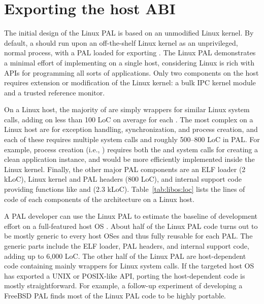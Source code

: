 \section{Exporting the host ABI}
\label{sec:linux:impl}

The initial design of the Linux PAL is based on an unmodified Linux kernel.
By default, a \graphene{} \picoproc{} should run upon
an off-the-shelf Linux kernel as an unprivileged, normal process, with a PAL loaded for exporting \thehostabi{}.
The Linux PAL demonstrates a minimal effort of implementing \thehostabi{}
on a single host, considering Linux is rich with APIs for programming all sorts of applications.
Only two \graphene{} components on the host requires extension or modification of the Linux kernel: a bulk IPC kernel module and a trusted reference monitor.



On a Linux host,
the majority of \hostapis{} are simply wrappers
for similar Linux system calls,
adding on less than 100 LoC on average for each \hostapi{}.
The most complex \hostapis{} on a Linux host are for exception handling, synchronization, and process creation, and each of these \hostapis{} requires multiple system calls and roughly 500--800 LoC in PAL.
For example, process creation (i.e., ) requires 
both the  and  system calls
for creating a clean
application instance, and would be more efficiently
implemented inside the Linux kernel.
Finally, the other major PAL components are an ELF loader (2 kLoC),
Linux kernel and PAL headers (800 LoC),
and internal support code providing functions like  and  (2.3 kLoC).
Table~\ref{tab:libos:loc} lists the lines of code of each components of the \graphene{} architecture on a Linux host.


A PAL developer can use the Linux PAL to estimate the baseline of \thehostabi{} development effort on a full-featured host OS .
About half of the Linux PAL code turns out to be
mostly generic to every host OSes
and thus fully reusable for each PAL.
The generic parts include
the ELF loader, PAL headers, and internal support code, adding up to \roughly{}6,000 LoC.
The other half of the Linux PAL are host-dependent code containing mainly wrappers for Linux system calls.
If the targeted host OS has exported a UNIX or POSIX-like API,
porting the host-dependent code is mostly straightforward.
For example, a follow-up experiment of developing a FreeBSD PAL finds most of the Linux PAL code to be highly portable.





